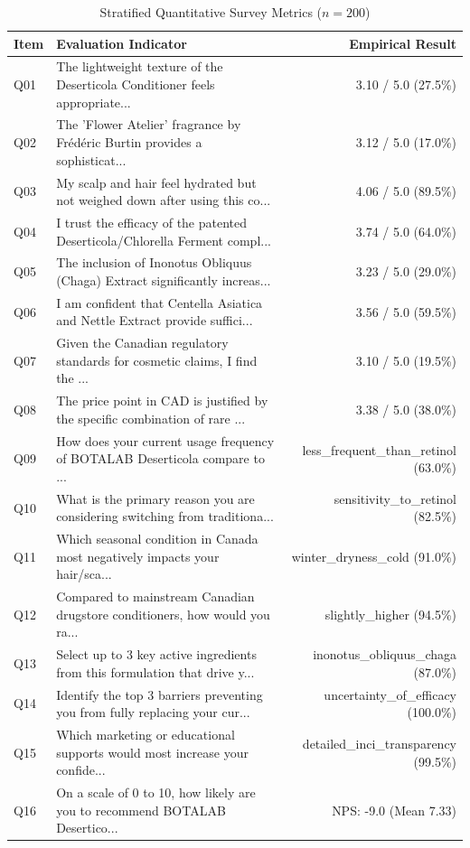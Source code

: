 \documentclass[10pt,twocolumn,a4paper]{article}
\begin{document}
\begin{table}[t]
\centering
\caption{Stratified Quantitative Survey Metrics ($n = 200$)}
\label{tab:metrics}
\small
\begin{tabularx}{\textwidth}{l X r}
\toprule
\textbf{Item} & \textbf{Evaluation Indicator} & \textbf{Empirical Result} \\
\midrule
Q01 & The lightweight texture of the Deserticola Conditioner feels appropriate... & 3.10 / 5.0 (27.5\%) \\
Q02 & The 'Flower Atelier' fragrance by Frédéric Burtin provides a sophisticat... & 3.12 / 5.0 (17.0\%) \\
Q03 & My scalp and hair feel hydrated but not weighed down after using this co... & 4.06 / 5.0 (89.5\%) \\
Q04 & I trust the efficacy of the patented Deserticola/Chlorella Ferment compl... & 3.74 / 5.0 (64.0\%) \\
Q05 & The inclusion of Inonotus Obliquus (Chaga) Extract significantly increas... & 3.23 / 5.0 (29.0\%) \\
Q06 & I am confident that Centella Asiatica and Nettle Extract provide suffici... & 3.56 / 5.0 (59.5\%) \\
Q07 & Given the Canadian regulatory standards for cosmetic claims, I find the ... & 3.10 / 5.0 (19.5\%) \\
Q08 & The price point in CAD is justified by the specific combination of rare ... & 3.38 / 5.0 (38.0\%) \\
Q09 & How does your current usage frequency of BOTALAB Deserticola compare to ... & less\_frequent\_than\_retinol (63.0\%) \\
Q10 & What is the primary reason you are considering switching from traditiona... & sensitivity\_to\_retinol (82.5\%) \\
Q11 & Which seasonal condition in Canada most negatively impacts your hair/sca... & winter\_dryness\_cold (91.0\%) \\
Q12 & Compared to mainstream Canadian drugstore conditioners, how would you ra... & slightly\_higher (94.5\%) \\
Q13 & Select up to 3 key active ingredients from this formulation that drive y... & inonotus\_obliquus\_chaga (87.0\%) \\
Q14 & Identify the top 3 barriers preventing you from fully replacing your cur... & uncertainty\_of\_efficacy (100.0\%) \\
Q15 & Which marketing or educational supports would most increase your confide... & detailed\_inci\_transparency (99.5\%) \\
Q16 & On a scale of 0 to 10, how likely are you to recommend BOTALAB Desertico... & NPS: -9.0 (Mean 7.33) \\
\bottomrule
\end{tabularx}
\end{table}
\end{document}
